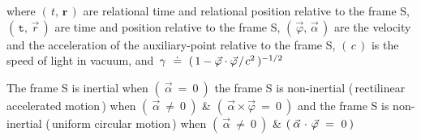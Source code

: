\documentclass[10pt,fleqn]{article}
\begin{document}
\par \vspace{+1.20em}
\noindent where $( \, t, \, \mathbf{r} \, )$ are relational time and relational position relative to the frame S, $( \, \mathtt{t}, \, \vec{r} \, )$ are time and position relative to the frame S, $( \, \vec{\varphi}, \, \vec{\alpha} \, )$ are the velocity and the acceleration of the auxiliary-point relative to the frame S, $( \, c \, )$ is the speed of light in vacuum, and {\small $\, \gamma ~\doteq~ (\,{1 - \vec{\varphi} \cdot \vec{\varphi}\hspace{+0.09em}/\hspace{+0.09em}c^2}\,)^{-1/2}$}
\par \vspace{+0.90em}
\noindent The frame S is inertial when $( \: \vec{\alpha} ~=~ 0 \: )$ the frame S is non-inertial (\,rectilinear accelerated motion\,) when $( \: \vec{\alpha} ~\ne~ 0 \: )$ {\small \&} $( \: \vec{\alpha} \times \vec{\varphi} ~=~ 0 \: )$ and the frame S is non-inertial (\,uniform circular motion\,) when $( \: \vec{\alpha} ~\ne~ 0 \: )$ {\small \&} $( \: \vec{\alpha} \hspace{+0.12em}\cdot\hspace{+0.12em} \vec{\varphi} ~=~ 0 \: )$

\newpage

\par {}

\bigskip \smallskip
\end{document}
